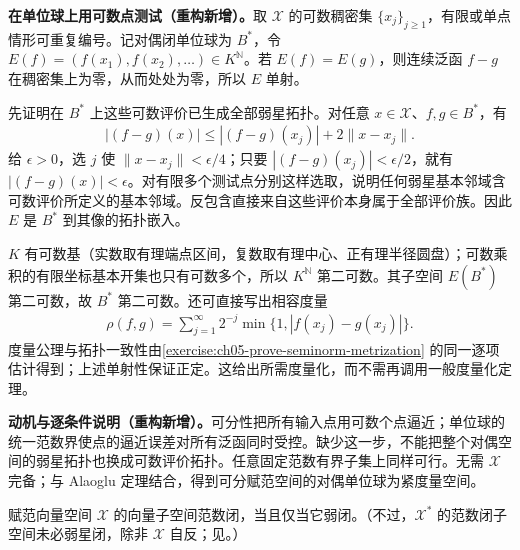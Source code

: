 \documentclass[../../main.tex]{subfiles}
\begin{document}
\begin{solution}
\textbf{在单位球上用可数点测试（重构新增）。}取 $\mathcal X$ 的可数稠密集 $\{x_j\}_{j\ge1}$，有限或单点情形可重复编号。记对偶闭单位球为 $B^*$，令 $E(f)=(f(x_1),f(x_2),\ldots)\in K^{\mathbb N}$。若 $E(f)=E(g)$，则连续泛函 $f-g$ 在稠密集上为零，从而处处为零，所以 $E$ 单射。

先证明在 $B^*$ 上这些可数评价已生成全部弱星拓扑。对任意 $x\in\mathcal X$、$f,g\in B^*$，有
\begin{align*}
|(f-g)(x)|\le |(f-g)(x_j)|+2\|x-x_j\|.
\end{align*}
给 $\epsilon>0$，选 $j$ 使 $\|x-x_j\|<\epsilon/4$；只要 $|(f-g)(x_j)|<\epsilon/2$，就有 $|(f-g)(x)|<\epsilon$。对有限多个测试点分别这样选取，说明任何弱星基本邻域含可数评价所定义的基本邻域。反包含直接来自这些评价本身属于全部评价族。因此 $E$ 是 $B^*$ 到其像的拓扑嵌入。

$K$ 有可数基（实数取有理端点区间，复数取有理中心、正有理半径圆盘）；可数乘积的有限坐标基本开集也只有可数多个，所以 $K^{\mathbb N}$ 第二可数。其子空间 $E(B^*)$ 第二可数，故 $B^*$ 第二可数。还可直接写出相容度量
\begin{align*}
\rho(f,g)=\sum_{j=1}^{\infty}2^{-j}\min\{1,|f(x_j)-g(x_j)|\}.
\end{align*}
度量公理与拓扑一致性由\cref{exercise:ch05-prove-seminorm-metrization} 的同一逐项估计得到；上述单射性保证正定。这给出所需度量化，而不需再调用一般度量化定理。
\end{solution}
\begin{remark}
\textbf{动机与逐条件说明（重构新增）。}可分性把所有输入点用可数个点逼近；单位球的统一范数界使点的逼近误差对所有泛函同时受控。缺少这一步，不能把整个对偶空间的弱星拓扑也换成可数评价拓扑。任意固定范数有界子集上同样可行。无需 $\mathcal X$ 完备；与 Alaoglu 定理结合，得到可分赋范空间的对偶单位球为紧度量空间。
\end{remark}
\begin{exercise}\label{exercise:ch05-norm-weak-closed-subspace}
赋范向量空间 $\mathcal X$ 的向量子空间范数闭，当且仅当它弱闭。（不过，$\mathcal X^*$ 的范数闭子空间未必弱星闭，除非 $\mathcal X$ 自反；见。）
\end{exercise}
\end{document}
